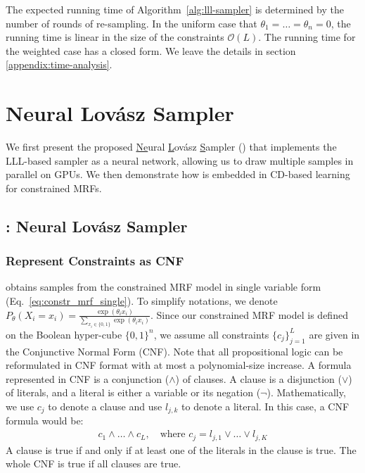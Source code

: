 The expected running time of Algorithm~\ref{alg:lll-sampler} is determined by
the number of rounds of re-sampling.
%
In the uniform case that $\theta_1=\ldots=\theta_n=0$, the running time is linear
in the size of the constraints $\mathcal{O}(L)$.
%
The running time for the weighted case has a closed form. We leave the details
in section \ref{appendix:time-analysis}.

\section{Neural Lov\'asz Sampler}
\label{sec:methodology}
We first present the proposed \underline{Ne}ural \underline{L}ov\'asz \underline{S}ampler {(\nls)} that implements the LLL-based sampler as a  neural network, allowing us to draw multiple samples in parallel on GPUs. %
We then demonstrate how \nls is embedded in CD-based learning for constrained MRFs.

\subsection{\nls: Neural Lov\'asz Sampler} \label{sec:nls}
\subsubsection*{Represent  Constraints as CNF}
\nls obtains samples from the constrained MRF model in  single variable form (Eq.~\ref{eq:constr_mrf_single}).
%
To simplify notations, we denote $P_{\theta}(X_i=x_i) = \frac{\exp(\theta_i
        x_i)} {\sum_{x_i\in \{0,1\}} \exp(\theta_i x_i)}$.
%
Since our constrained MRF model is defined on the Boolean hyper-cube
$\{0,1\}^n$, we assume all constraints $\{c_j\}_{j=1}^L$ are given in the
Conjunctive Normal Form (CNF).
%
Note that all propositional logic can be reformulated in CNF format with at
most a polynomial-size increase. A formula represented in CNF is a conjunction
($\wedge$) of clauses.
%
A clause is a disjunction ($\vee$) of literals, and a literal is either a
variable or its negation ($\neg$).
%
Mathematically, we use $c_j$ to denote a clause and use $l_{j,k}$ to denote a
literal. In this case, a CNF formula would be:
\begin{align} \label{eq:cnf}
    c_1\wedge\ldots\wedge  c_L,\quad \text{where } c_j = l_{j,1}\vee\ldots\vee l_{j,K}
\end{align}
A clause is true if and only if at least one of the literals in the clause is true.
%
The whole CNF is true if all clauses are true.

